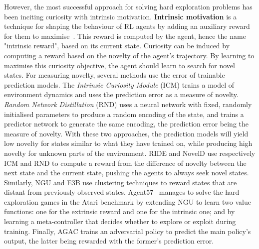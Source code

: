 However, the most successful approach for solving hard exploration problems has been inciting curiosity with intrinsic motivation. 
\textbf{Intrinsic motivation} is a technique for shaping the behaviour of RL agents by adding an auxiliary reward for them to maximise~\citep{Schmidhuber1991, Oudeyer2007_IntrMotiv, lehman2011abandoning}. This reward is computed by the agent, hence the name "intrinsic reward", based on its current state. Curiosity can be induced by computing a reward based on the novelty of the agent's trajectory. By learning to maximise this curiosity objective, the agent should learn to search for novel states. 
For measuring novelty, several methods use the error of trainable prediction models. The \textit{Intrinsic Curiosity Module} (ICM) \citep{Pathak2017_ICM} trains a model of environment dynamics and uses the prediction error as a measure of novelty. \textit{Random Network Distillation} (RND) \citep{Burda2019_RND} uses a neural network with fixed, randomly initialised parameters to produce a random encoding of the state, and trains a predictor network to generate the same encoding, the prediction error being the measure of novelty. With these two approaches, the prediction models will yield low novelty for states similar to what they have trained on, while producing high novelty for unknown parts of the environment. RIDE \citep{Raileanu2020_RIDE} and NovelD \citep{Zhang2021_NovelD} use respectively ICM and RND to compute a reward from the difference of novelty between the next state and the current state, pushing the agents to always seek novel states. Similarly, NGU \citep{Badia2020_NGU} and E3B \citep{Henaff2022_E3B} use clustering techniques to reward states that are distant from previously observed states. Agent57~\citep{Badia2020_Agent57} manages to solve the hard exploration games in the Atari benchmark by extending NGU to learn two value functions: one for the extrinsic reward and one for the intrinsic one; and by learning a meta-controller that decides whether to explore or exploit during training. Finally, AGAC \citep{FletBerliac2021_AGAC} trains an adversarial policy to predict the main policy’s output, the latter being rewarded with the former’s prediction error. 



